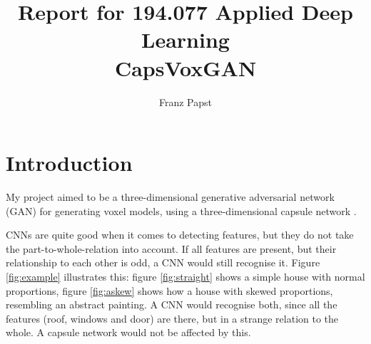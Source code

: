 \documentclass[11pt]{article}
\title{Report for 194.077 Applied Deep Learning\\\vspace{15pt}CapsVoxGAN}
\author{Franz Papst}
\begin{document}
\maketitle

\section{Introduction}

My project aimed to be a three-dimensional generative adversarial network (GAN) \cite{goodfellow2014} for generating voxel models, using a three-dimensional capsule network \cite{sabour2017}.

CNNs are quite good when it comes to detecting features, but they do not take the part-to-whole-relation into account. If all features are present, but their relationship to each other is odd, a CNN would still recognise it. Figure \ref{fig:example} illustrates this: figure \ref{fig:straight} shows a simple house with normal proportions, figure \ref{fig:askew} shows how a house with skewed proportions, resembling an abstract painting. A CNN would recognise both, since all the features (roof, windows and door) are there, but in a strange relation to the whole. A capsule network would not be affected by this.
\end{document}
